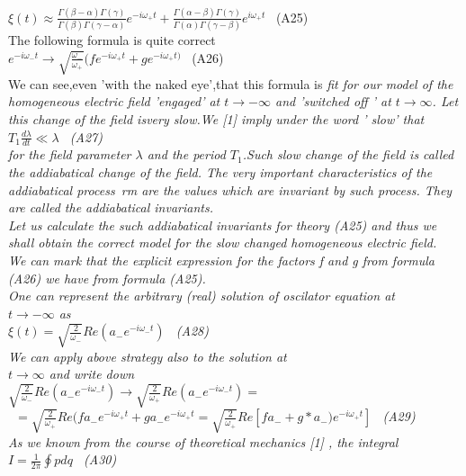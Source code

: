 \documentclass[a4paper,12pt] {article}
\begin{document}
 \\$\xi (t)\approx \frac  {\Gamma(\beta-\alpha)\Gamma(\gamma)}{\Gamma(\beta)\Gamma (\gamma-\alpha)}e^{-i \omega_+t}+ \frac  {\Gamma(\alpha-\beta)\Gamma(\gamma)}{\Gamma(\alpha)\Gamma(\gamma-\beta)}
e^{i\omega_+t} $ \ (A25)\\ The following formula is quite correct
\\$ e^{-i\omega_-t} \to \sqrt {\frac {\omega_-}{\omega_+}} (f e^{-i\omega_+t}+ge^{-i\omega_+t)} $ \ (A26)
\\ We can see,even 'with the naked eye',that this formula is \it fit \rm  for our model of the homogeneous
 electric field 'engaged' at $ t \to -\infty $ and 'switched off ' at $ t \to \infty $. Let this change of the field
is\it  very slow.\rm  We [1] imply under the word ' slow' that
\\ $ T_1 \frac {d \lambda}{dt} \ll \lambda  $ \ (A27)\\ for the field parameter $\lambda $ and the period
$ T_1$.Such slow change of the field is called \it the addiabatical change \rm  of the field. The very
important characteristics of the  \it addiabatical process\ rm  are the values which are \it  invariant \rm  by
 such process. They are called \it the addiabatical invariants.\\  \rm Let us calculate the such
addiabatical invariants for theory (A25) and thus we shall obtain the correct model \it  for the slow
changed  homogeneous electric field.
\\  \rm  We can mark  that the explicit expression for the factors f and g from formula  (A26) we have  from
 formula  (A25).\\ One can represent the arbitrary (real) solution of  oscilator equation at\\ $ t\to -\infty $ as
 \\$ \xi (t)=\sqrt {\frac {2}{\omega_-}} Re (a_-
e^{-i\omega_-t}) $ \ (A28) \\ We can apply  above strategy also to the solution at\\ $ t\to \infty $ and write down \\$\sqrt {\frac {2}{\omega_-}} Re (a_-e^{-i\omega_-t}) \to \sqrt {\frac {2}{\omega_+}} Re (a_-e^{-i\omega_-t}) =$ \\\ $ = \sqrt {\frac {2}{\omega_+}} Re (f a_-e^{-i \omega_+t}+g a_-
e^{-i \omega_+t} =\sqrt {\frac {2}{\omega_+}} Re[f a_-+g*a_-)e^{-i \omega_+t}] $ \ (A29)\\ As we
 known from the course of theoretical mechanics [1] , the integral \\$ I= \frac {1}{2\pi} \oint p dq $ \ (A30)
\end{document}
